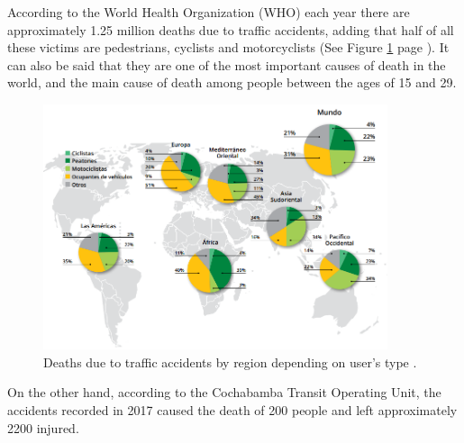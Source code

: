 According to the World Health Organization (WHO) each year there are approximately 1.25 million deaths due to traffic accidents, adding that half of all these victims are pedestrians, cyclists and motorcyclists (See Figure \ref{fig:oms} page \pageref{fig:oms}). It can also be said that they are one of the most important causes of death in the world, and the main cause of death among people between the ages of 15 and 29.

\vspace{5mm} %

\begin{figure}[h!]
  \begin{center}	\includegraphics[width=0.9\textwidth, fbox]{imagenes/Cap1/oms1}
  \caption{Deaths due to traffic accidents by region depending on user's type \protect\cite{Reference65}.}
  \label{fig:oms}  
  \end{center}
\end{figure}

On the other hand, according to the Cochabamba Transit Operating Unit, the accidents recorded in 2017 caused the death of 200 people and left approximately 2200 injured.
	

